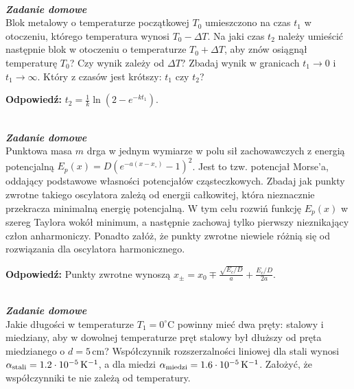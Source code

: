\documentclass[11pt,a4paper]{article}
\newcounter{zaddom}\newcommand{\zaddom}[1][]{\addtocounter{zaddom}{1} ~\\  {\bf \emph{Zadanie domowe \arabic{zaddom} #1 }} \\}
\begin{document}
\zaddom
Blok metalowy o temperaturze początkowej $T_0$ umieszczono na czas $t_1$ w otoczeniu,
którego temperatura wynosi $T_0-\Delta T$. Na jaki czas $t_2$ należy umieścić następnie blok
w otoczeniu o temperaturze $T_0+\Delta T$, aby znów osiągnął temperaturę $T_0$?
Czy wynik zależy od $\Delta T$? 
Zbadaj wynik w granicach $t_1\rightarrow 0$ i $t_1\rightarrow \infty$. 
Który z czasów jest krótszy: $t_1$ czy $t_2$?

\vskip 10pt

\textbf{Odpowiedź:} $t_2 = \frac{1}{k} \ln \left(2 - e^{-k t_1}\right)$. 


\vskip 10pt



\zaddom 
Punktowa masa $m$ drga w jednym wymiarze w polu sił zachowawczych
z energią potencjalną  \linebreak \mbox{$E_p(x) = D \left(e^{-a(x-x_\circ)}-1\right)^2$.}
Jest to tzw. potencjał Morse’a, oddający podstawowe własności potencjałów cząstecz\-kowych.
Zbadaj jak punkty zwrotne takiego oscylatora zależą od energii całkowitej, która nieznacznie
przekracza minimalną energię potencjalną. W tym celu rozwiń funkcję $E_p(x)$
w szereg Taylora wokół minimum, a następnie zachowaj tylko pierwszy nieznikający człon anharmoniczy. 
Ponadto załóż, że punkty zwrotne niewiele różnią się od rozwiązania dla oscylatora harmonicznego.

\vskip 10pt

\textbf{Odpowiedź:} Punkty zwrotne wynoszą $x_{\pm} = x_0 \mp \frac{\sqrt{E_c/D}}{a} + \frac{E_c/D}{2a}$. 

\zaddom
Jakie długości w temperaturze $T_1 = 0^\circ$C powinny mieć dwa pręty: stalowy i miedziany,
aby w dowolnej temperaturze pręt stalowy był dłuższy od pręta miedzianego o $d = 5\,$cm?
Współczynnik rozszerzalności liniowej dla stali wynosi
$\alpha_{\rm{stali}} = 1.2\cdot10^{-5}\,{\rm K}^{-1}$, a dla miedzi
$\alpha_{\rm{miedzi}} = 1.6\cdot 10^{-5}\,{\rm K}^{-1}$.
Założyć, że współczynniki te nie zależą od temperatury.
\end{document}
